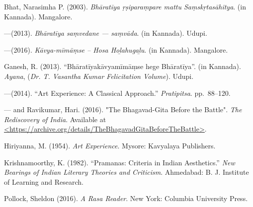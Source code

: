 \begin{thebibliography}{99}
\itemsep=2pt
Bhat, Narasimha P. (2003). \textsl{Bhāratīya ṛṣiparaṃpare mattu Saṃskṛtasāhitya}. (in Kannada). Mangalore. 

---\kern3pt(2013). \textsl{Bhāratīya saṃvedane --- saṃvāda}. (in Kannada). Udupi.

---\kern3pt(2016). \textsl{Kāvya-mīmāṃse -- Hosa Hoḻahugaḻu}. (in Kannada). Mangalore.

Ganesh, R. (2013). ``Bhāratīyakāvyamīmāṃse hege Bhāratīya''. (in Kannada). \textsl{Ayana}, (\textsl{Dr. T. Vasantha Kumar Felicitation Volume}). Udupi.

---\kern3pt(2014). ``Art Experience: A Classical Approach.'' \textsl{Pratipitsa}. pp.~88--120.

---\kern3pt and Ravikumar, Hari. (2016). "The Bhagavad-Gita Before the Battle". \textsl{The Rediscovery of India}. Available at \url{<https://archive.org/details/TheBhagavadGitaBeforeTheBattle>}.

Hiriyanna, M. (1954). \textsl{Art Experience}. Mysore: Kavyalaya Publishers.

Krishnamoorthy, K. (1982). ``Pramanas: Criteria in Indian Aesthetics.'' \textsl{New Bearings of Indian Literary Theories and Criticism}. Ahmedabad: B. J. Institute of Learning and Research.

Pollock, Sheldon (2016). \textsl{A Rasa Reader}. New York: Columbia University Press.
\end{thebibliography}

\theendnotes
\label{chapter\thechapter:end}
